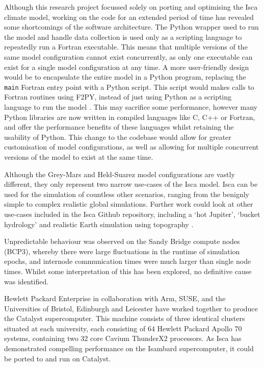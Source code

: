 \documentclass[a4paper,11pt]{report}
\begin{document}
Although this research project focussed solely on porting and optimising the Isca climate model, working on the code for an extended period of time has revealed some shortcomings of the software architecture. The Python wrapper used to run the model and handle data collection is used only as a scripting language to repeatedly run a Fortran executable. This means that multiple versions of the same model configuration cannot exist concurrently, as only one executable can exist for a single model configuration at any time. A more user-friendly design would be to encapsulate the entire model in a Python program, replacing the \texttt{main} Fortran entry point with a Python script. This script would makes calls to Fortran routines using F2PY, instead of just using Python as a scripting language to run the model \cite{peterson2009f2py}. This may sacrifice some performance, however many Python libraries are now written in compiled languages like C, C++ or Fortran, and offer the performance benefits of these languages whilst retaining the usability of Python. This change to the codebase would allow for greater customisation of model configurations, as well as allowing for multiple concurrent versions of the model to exist at the same time. 
\par
Although the Grey-Mars and Held-Suarez model configurations are vastly different, they only represent two narrow use-cases of the Isca model. Isca can be used for the simulation of countless other scenarios, ranging from the benignly simple to complex realistic global simulations. Further work could look at other use-cases included in the Isca Github repository, including a `hot Jupiter', `bucket hydrology' and realistic Earth simulation using topography \cite{isca2019github}. 
\par
Unpredictable behaviour was observed on the Sandy Bridge compute nodes (BCP3), whereby there were large fluctuations in the runtime of simulation epochs, and internode communication times were much larger than single node times. Whilst some interpretation of this has been explored, no definitive cause was identified.
\par
Hewlett Packard Enterprise in collaboration with Arm, SUSE, and the Universities of Bristol, Edinburgh and Leicester have worked together to produce the Catalyst supercomputer. This machine consists of three identical clusters situated at each university, each consisting of 64 Hewlett Packard Apollo 70 systems, containing two 32 core Cavium ThunderX2 processors. As Isca has demonstrated compelling performance on the Isambard supercomputer, it could be ported to and run on Catalyst. 
\end{document}
